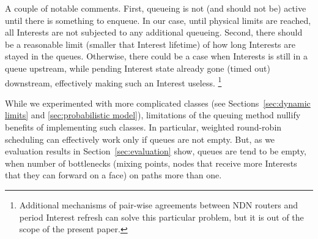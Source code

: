 A couple of notable comments.
First, queueing is not (and should not be) active until there is something to enqueue.
In our case, until physical limits are reached, all Interests are not subjected to any additional queueing.
Second, there should be a reasonable limit (smaller that Interest lifetime) of how long Interests are stayed in the queues.
Otherwise, there could be a case when Interests is still in a queue upstream, while pending Interest state already gone (timed out) downstream, effectively making such an Interest useless.%
\footnote{Additional mechanisms of pair-wise agreements between NDN routers and period Interest refresh can solve this particular problem, but it is out of the scope of the present paper.}

While we experimented with more complicated classes (see Sections~\ref{sec:dynamic limits} and \ref{sec:probabilistic model}), limitations of the queuing method nullify benefits of implementing such classes.
In particular, weighted round-robin scheduling can effectively work only if queues are not empty.
But, as we evaluation results in Section~\ref{sec:evaluation} show, queues are tend to be empty, when number of bottlenecks (mixing points, nodes that receive more Interests that they can forward on a face) on paths more than one.


